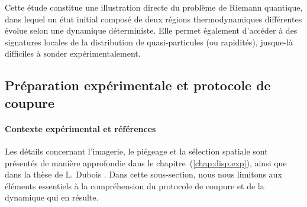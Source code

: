 Cette étude constitue une illustration directe du problème de Riemann quantique, dans lequel un état initial composé de deux régions thermodynamiques différentes évolue selon une dynamique déterministe. Elle permet également d’accéder à des signatures locales de la distribution de quasi-particules (ou rapidités), jusque-là difficiles à sonder expérimentalement.

\medskip



\subsection{Préparation expérimentale et protocole de coupure}
\label{chap6:sec.propcol}



\paragraph{Contexte expérimental et références}
Les détails concernant l’imagerie, le piégeage et la sélection spatiale sont présentés de manière approfondie dans le {chapitre~(\ref{chap:disp.exp})}, ainsi que dans la thèse de L. Dubois \cite{L.Dubois2024}. Dans cette sous-section, nous nous limitons aux éléments essentiels à la compréhension du protocole de coupure et de la dynamique qui en résulte.

